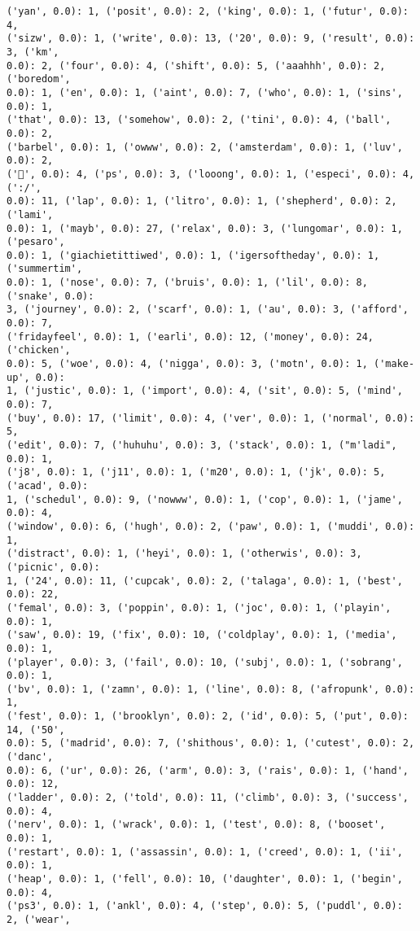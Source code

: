 \documentclass[11pt]{article}
\begin{document}
\begin{Verbatim}[commandchars=\\\{\}]
('yan', 0.0): 1, ('posit', 0.0): 2, ('king', 0.0): 1, ('futur', 0.0): 4,
('sizw', 0.0): 1, ('write', 0.0): 13, ('20', 0.0): 9, ('result', 0.0): 3, ('km',
0.0): 2, ('four', 0.0): 4, ('shift', 0.0): 5, ('aaahhh', 0.0): 2, ('boredom',
0.0): 1, ('en', 0.0): 1, ('aint', 0.0): 7, ('who', 0.0): 1, ('sins', 0.0): 1,
('that', 0.0): 13, ('somehow', 0.0): 2, ('tini', 0.0): 4, ('ball', 0.0): 2,
('barbel', 0.0): 1, ('owww', 0.0): 2, ('amsterdam', 0.0): 1, ('luv', 0.0): 2,
('💖', 0.0): 4, ('ps', 0.0): 3, ('looong', 0.0): 1, ('especi', 0.0): 4, (':/',
0.0): 11, ('lap', 0.0): 1, ('litro', 0.0): 1, ('shepherd', 0.0): 2, ('lami',
0.0): 1, ('mayb', 0.0): 27, ('relax', 0.0): 3, ('lungomar', 0.0): 1, ('pesaro',
0.0): 1, ('giachietittiwed', 0.0): 1, ('igersoftheday', 0.0): 1, ('summertim',
0.0): 1, ('nose', 0.0): 7, ('bruis', 0.0): 1, ('lil', 0.0): 8, ('snake', 0.0):
3, ('journey', 0.0): 2, ('scarf', 0.0): 1, ('au', 0.0): 3, ('afford', 0.0): 7,
('fridayfeel', 0.0): 1, ('earli', 0.0): 12, ('money', 0.0): 24, ('chicken',
0.0): 5, ('woe', 0.0): 4, ('nigga', 0.0): 3, ('motn', 0.0): 1, ('make-up', 0.0):
1, ('justic', 0.0): 1, ('import', 0.0): 4, ('sit', 0.0): 5, ('mind', 0.0): 7,
('buy', 0.0): 17, ('limit', 0.0): 4, ('ver', 0.0): 1, ('normal', 0.0): 5,
('edit', 0.0): 7, ('huhuhu', 0.0): 3, ('stack', 0.0): 1, ("m'ladi", 0.0): 1,
('j8', 0.0): 1, ('j11', 0.0): 1, ('m20', 0.0): 1, ('jk', 0.0): 5, ('acad', 0.0):
1, ('schedul', 0.0): 9, ('nowww', 0.0): 1, ('cop', 0.0): 1, ('jame', 0.0): 4,
('window', 0.0): 6, ('hugh', 0.0): 2, ('paw', 0.0): 1, ('muddi', 0.0): 1,
('distract', 0.0): 1, ('heyi', 0.0): 1, ('otherwis', 0.0): 3, ('picnic', 0.0):
1, ('24', 0.0): 11, ('cupcak', 0.0): 2, ('talaga', 0.0): 1, ('best', 0.0): 22,
('femal', 0.0): 3, ('poppin', 0.0): 1, ('joc', 0.0): 1, ('playin', 0.0): 1,
('saw', 0.0): 19, ('fix', 0.0): 10, ('coldplay', 0.0): 1, ('media', 0.0): 1,
('player', 0.0): 3, ('fail', 0.0): 10, ('subj', 0.0): 1, ('sobrang', 0.0): 1,
('bv', 0.0): 1, ('zamn', 0.0): 1, ('line', 0.0): 8, ('afropunk', 0.0): 1,
('fest', 0.0): 1, ('brooklyn', 0.0): 2, ('id', 0.0): 5, ('put', 0.0): 14, ('50',
0.0): 5, ('madrid', 0.0): 7, ('shithous', 0.0): 1, ('cutest', 0.0): 2, ('danc',
0.0): 6, ('ur', 0.0): 26, ('arm', 0.0): 3, ('rais', 0.0): 1, ('hand', 0.0): 12,
('ladder', 0.0): 2, ('told', 0.0): 11, ('climb', 0.0): 3, ('success', 0.0): 4,
('nerv', 0.0): 1, ('wrack', 0.0): 1, ('test', 0.0): 8, ('booset', 0.0): 1,
('restart', 0.0): 1, ('assassin', 0.0): 1, ('creed', 0.0): 1, ('ii', 0.0): 1,
('heap', 0.0): 1, ('fell', 0.0): 10, ('daughter', 0.0): 1, ('begin', 0.0): 4,
('ps3', 0.0): 1, ('ankl', 0.0): 4, ('step', 0.0): 5, ('puddl', 0.0): 2, ('wear',

\end{Verbatim}
\end{document}
